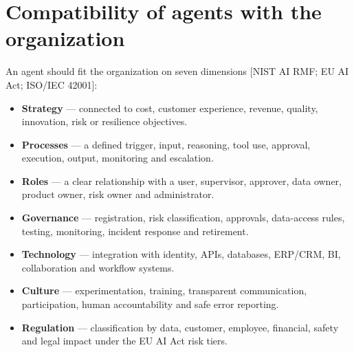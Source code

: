 \begin{center}
\end{center}

\section{Compatibility of agents with the organization}

An agent should fit the organization on seven dimensions [NIST AI RMF;
EU AI Act; ISO/IEC 42001]:
\begin{itemize}
  \item \textbf{Strategy} — connected to cost, customer experience, revenue,
        quality, innovation, risk or resilience objectives.
  \item \textbf{Processes} — a defined trigger, input, reasoning, tool use,
        approval, execution, output, monitoring and escalation.
  \item \textbf{Roles} — a clear relationship with a user, supervisor,
        approver, data owner, product owner, risk owner and administrator.
  \item \textbf{Governance} — registration, risk classification, approvals,
        data-access rules, testing, monitoring, incident response and
        retirement.
  \item \textbf{Technology} — integration with identity, APIs, databases,
        ERP/CRM, BI, collaboration and workflow systems.
  \item \textbf{Culture} — experimentation, training, transparent
        communication, participation, human accountability and safe error
        reporting.
  \item \textbf{Regulation} — classification by data, customer, employee,
        financial, safety and legal impact under the EU AI Act risk tiers.
\end{itemize}
